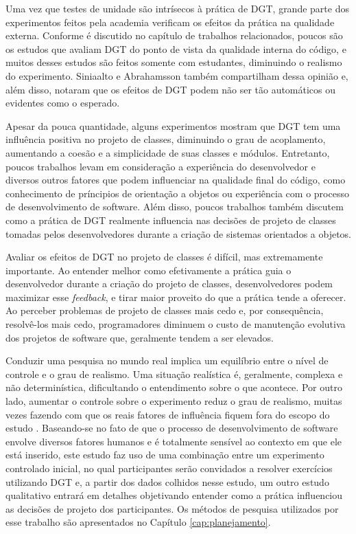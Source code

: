 Uma vez que testes de unidade são intrísecos à prática de DGT, 
grande parte dos experimentos feitos pela academia verificam os
efeitos da prática na qualidade externa. Conforme é discutido no capítulo de
trabalhos relacionados, poucos são os estudos que avaliam DGT do
ponto de vista da qualidade interna do código, e muitos desses estudos
são feitos somente com estudantes, diminuindo o realismo do experimento. 
Siniaalto e Abrahamsson \cite{alarming-results} também
compartilham dessa opinião e, além disso, notaram que os efeitos de DGT podem 
não ser tão automáticos ou evidentes como o esperado.

Apesar da pouca quantidade, alguns experimentos mostram que DGT tem uma influência
positiva no projeto de classes, diminuindo o grau de acoplamento, aumentando
a coesão e a simplicidade de suas classes e módulos. Entretanto, poucos trabalhos
levam em consideração a experiência do desenvolvedor e diversos
outros fatores que podem influenciar na qualidade final do código, como conhecimento
de príncipios de orientação a objetos ou experiência com o processo de 
desenvolvimento de software. Além disso, poucos trabalhos também discutem como
a prática de DGT realmente influencia 
nas decisões de projeto de classes tomadas pelos desenvolvedores durante a criação de sistemas 
orientados a objetos.

Avaliar os efeitos de DGT no projeto de classes é difícil, mas extremamente importante.
Ao entender melhor como efetivamente a prática guia o desenvolvedor durante
a criação do projeto de classes, desenvolvedores podem maximizar esse \textit{feedback},
e tirar maior proveito do que a prática tende a oferecer. Ao perceber 
problemas de projeto de classes mais cedo e, por consequência, resolvê-los
mais cedo, programadores diminuem o custo de manutenção evolutiva dos projetos
de software que, geralmente tendem a ser elevados.

Conduzir uma pesquisa no mundo real implica um equilíbrio entre o nível de controle
e o grau de realismo. Uma situação realística é, geralmente, complexa e 
não determinística, dificultando o entendimento sobre o que acontece. Por outro
lado, aumentar o controle sobre o experimento reduz o grau de realismo, muitas
vezes fazendo com que os reais fatores de influência fiquem fora do escopo do 
estudo \cite{guidelines-case-study}.
Baseando-se no fato de que o processo de desenvolvimento de software envolve 
diversos fatores humanos e é totalmente sensível ao contexto em que ele está 
inserido, 
este estudo faz uso de uma combinação entre um experimento controlado inicial, 
no qual participantes serão convidados a resolver exercícios utilizando DGT e, 
a partir dos dados colhidos nesse estudo, um outro estudo qualitativo entrará em 
detalhes objetivando entender como a prática influenciou as decisões de projeto 
dos participantes. Os métodos de pesquisa utilizados por
esse trabalho são apresentados no Capítulo \ref{cap:planejamento}.

